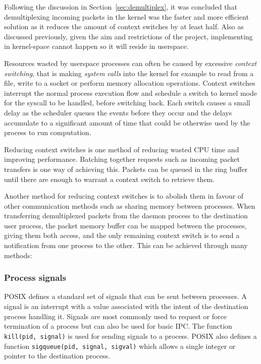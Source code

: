 \documentclass[11pt,a4paper,british]{bhamarticle}
\begin{document}
\begin{multicols}{2}
Following the discussion in Section~\ref{sec:demultiplex}, it was concluded that demultiplexing incoming packets in the kernel was the faster and more efficient solution as it reduces the amount of context switches by at least half. Also as discussed previously, given the aim and restrictions of the project, implementing in kernel-space cannot happen so it will reside in userspace.

Resources wasted by userspace processes can often be caused by excessive \textit{context switching}, that is making \textit{system calls} into the kernel for example to read from a file, write to a socket or perform memory allocation operations. Context switches interrupt the normal process execution flow and schedule a switch to kernel mode for the syscall to be handled, before switching back. Each switch causes a small delay as the scheduler queues the events before they occur and the delays accumulate to a significant amount of time that could be otherwise used by the process to run computation.

Reducing context switches is one method of reducing wasted CPU time and improving performance. Batching together requests such as incoming packet transfers is one way of achieving this. Packets can be queued in the ring buffer until there are enough to warrant a context switch to retrieve them.

Another method for reducing context switches is to abolish them in favour of other communication methods such as sharing memory between processes. When transferring demultiplexed packets from the daemon process to the destination user process, the packet memory buffer can be mapped between the processes, giving them both access, and the only remaining context switch is to send a notification from one process to the other. This can be achieved through many methods:
\subsubsection{Process signals} 
POSIX defines a standard set of signals that can be sent between processes. A signal is an interrupt with a value associated with the intent of the destination process handling it. Signals are most commonly used to request or force termination of a process but can also be used for basic IPC\@. The function \texttt{kill(pid, signal)} is used for sending signals to a process. POSIX also defines a function \texttt{sigqueue(pid, signal, sigval)} which allows a single integer or pointer to the destination process.


\end{multicols}
\end{document}
